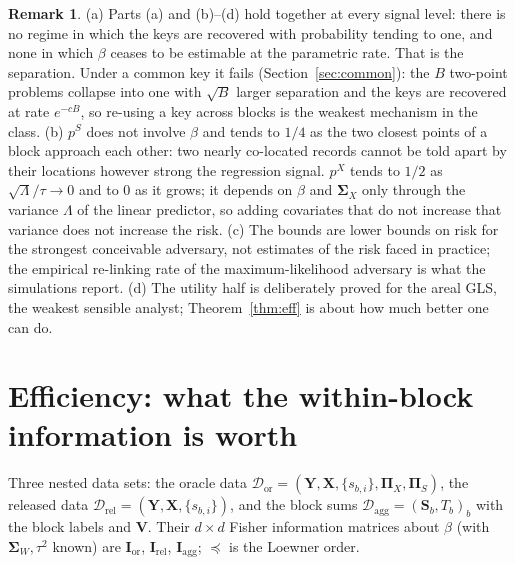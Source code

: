 \documentclass[11pt]{article}
\theoremstyle{definition}
\newtheorem{remark}{Remark}
\newcommand{\bX}{\mathbf{X}}
\newcommand{\bY}{\mathbf{Y}}
\newcommand{\bS}{\mathbf{S}}
\newcommand{\bV}{\mathbf{V}}
\newcommand{\bSig}{\boldsymbol{\Sigma}}
\newcommand{\bPi}{\boldsymbol{\Pi}}
\newcommand{\calD}{\mathcal{D}}
\newcommand{\rel}{\mathrm{rel}}
\newcommand{\agg}{\mathrm{agg}}
\newcommand{\orc}{\mathrm{or}}
\begin{document}
\begin{remark}\label{rem:sep}
(a) Parts (a) and (b)--(d) hold together at every signal level: there is no regime in which the keys are recovered with probability tending to one, and none in which $\beta$ ceases to be estimable at the parametric rate. That is the separation. Under a common key it fails (Section~\ref{sec:common}): the $B$ two-point problems collapse into one with $\sqrt B$ larger separation and the keys are recovered at rate $e^{-cB}$, so re-using a key across blocks is the weakest mechanism in the class. (b) $p^S$ does not involve $\beta$ and tends to $1/4$ as the two closest points of a block approach each other: two nearly co-located records cannot be told apart by their locations however strong the regression signal. $p^X$ tends to $1/2$ as $\sqrt\Lambda/\tau\to0$ and to $0$ as it grows; it depends on $\beta$ and $\bSig_X$ only through the variance $\Lambda$ of the linear predictor, so adding covariates that do not increase that variance does not increase the risk. (c) The bounds are lower bounds on risk for the strongest conceivable adversary, not estimates of the risk faced in practice; the empirical re-linking rate of the maximum-likelihood adversary is what the simulations report. (d) The utility half is deliberately proved for the areal GLS, the weakest sensible analyst; Theorem~\ref{thm:eff} is about how much better one can do.
\end{remark}

\section{Efficiency: what the within-block information is worth}\label{sec:eff}

Three nested data sets: the oracle data $\calD_\orc=(\bY,\bX,\{s_{b,i}\},\bPi_X,\bPi_S)$, the released data $\calD_\rel=(\bY,\bX,\{s_{b,i}\})$, and the block sums $\calD_\agg=(\bS_b,T_b)_b$ with the block labels and $\bV$. Their $d\times d$ Fisher information matrices about $\beta$ (with $\bSig_W,\tau^2$ known) are $\mathbf I_\orc$, $\mathbf I_\rel$, $\mathbf I_\agg$; $\preceq$ is the Loewner order.
\end{document}
